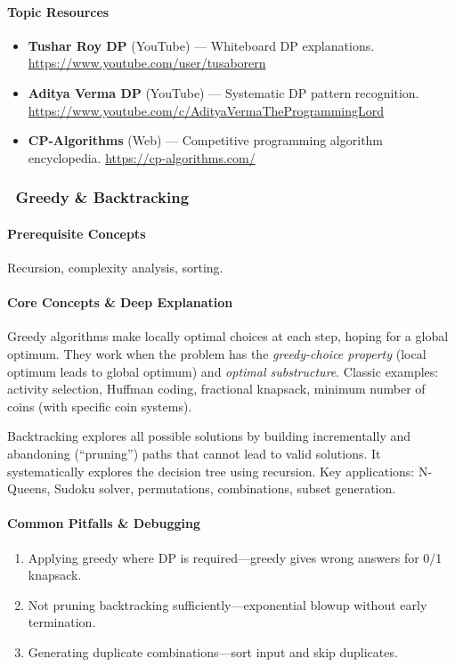 \documentclass[11pt, a4paper, oneside]{report}
\newcommand{\mustmaster}[1]{\subsubsection{\texorpdfstring{\fcolorbox{blue!40!black}{blue!8}{\footnotesize\bfseries\color{blue!40!black} MUST MASTER}~#1}{#1}}}
\begin{document}
\paragraph{Topic Resources}
\begin{itemize}[leftmargin=*]
\item \textbf{Tushar Roy DP} (YouTube) --- Whiteboard DP explanations. \url{https://www.youtube.com/user/tusaborern}
\item \textbf{Aditya Verma DP} (YouTube) --- Systematic DP pattern recognition. \url{https://www.youtube.com/c/AdityaVermaTheProgrammingLord}
\item \textbf{CP-Algorithms} (Web) --- Competitive programming algorithm encyclopedia. \url{https://cp-algorithms.com/}
\end{itemize}

\mustmaster{Greedy \& Backtracking}

\paragraph{Prerequisite Concepts} Recursion, complexity analysis, sorting.

\paragraph{Core Concepts \& Deep Explanation} Greedy algorithms make locally optimal choices at each step, hoping for a global optimum. They work when the problem has the \emph{greedy-choice property} (local optimum leads to global optimum) and \emph{optimal substructure}. Classic examples: activity selection, Huffman coding, fractional knapsack, minimum number of coins (with specific coin systems).

Backtracking explores all possible solutions by building incrementally and abandoning (``pruning'') paths that cannot lead to valid solutions. It systematically explores the decision tree using recursion. Key applications: N-Queens, Sudoku solver, permutations, combinations, subset generation.

\paragraph{Common Pitfalls \& Debugging}
\begin{enumerate}[leftmargin=*]
\item Applying greedy where DP is required---greedy gives wrong answers for 0/1 knapsack.
\item Not pruning backtracking sufficiently---exponential blowup without early termination.
\item Generating duplicate combinations---sort input and skip duplicates.
\end{enumerate}
\end{document}
